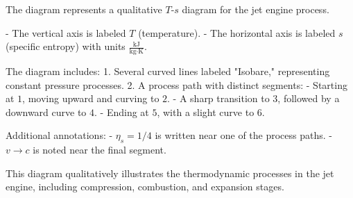 The diagram represents a qualitative \( T \)-\( s \) diagram for the jet engine process.  

- The vertical axis is labeled \( T \) (temperature).  
- The horizontal axis is labeled \( s \) (specific entropy) with units \( \frac{\text{kJ}}{\text{kg·K}} \).  

The diagram includes:  
1. Several curved lines labeled "Isobare," representing constant pressure processes.  
2. A process path with distinct segments:  
   - Starting at \( 1 \), moving upward and curving to \( 2 \).  
   - A sharp transition to \( 3 \), followed by a downward curve to \( 4 \).  
   - Ending at \( 5 \), with a slight curve to \( 6 \).  

Additional annotations:  
- \( \eta_s = 1/4 \) is written near one of the process paths.  
- \( v \to c \) is noted near the final segment.  

This diagram qualitatively illustrates the thermodynamic processes in the jet engine, including compression, combustion, and expansion stages.
